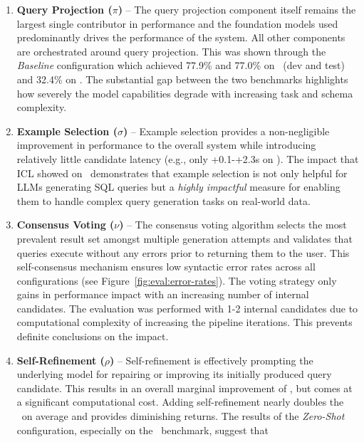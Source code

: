 \begin{enumerate}
    \item \textbf{Query Projection ($\pi$)} – The query projection component
        itself remains the largest single contributor in performance and the
        foundation models used predominantly drives the performance of the
        system. All other components are orchestrated around query projection.
        This was shown through the \textit{Baseline} configuration which
        achieved 77.9\% and 77.0\% on \Spider~(dev and test) and 32.4\% on
        \Bird. The substantial gap between the two benchmarks highlights how
        severely the model capabilities degrade with increasing task and schema
        complexity.
    \item \textbf{Example Selection ($\sigma$)} – Example selection provides a
        non-negligible improvement in performance to the overall system while
        introducing relatively little candidate latency (e.g., only +0.1-+2.3s
        on \Spider). The impact that ICL showed on \Bird~demonstrates that
        example selection is not only helpful for LLMs generating SQL queries
        but a \textit{highly impactful} measure for enabling them to handle
        complex query generation tasks on real-world data.
    \item \textbf{Consensus Voting ($\nu$)} – The consensus voting algorithm
        selects the most prevalent result set amongst multiple generation
        attempts and validates that queries execute without any errors prior to
        returning them to the user. This self-consensus mechanism ensures low
        syntactic error rates across all configurations
        (see Figure~\ref{fig:eval:error-rates}). The voting strategy only
        gains in performance impact with an increasing number of
        internal candidates. The evaluation was performed with 1-2 internal
        candidates due to computational complexity of increasing the pipeline
        iterations. This prevents definite conclusions on the impact.
    \item \textbf{Self-Refinement ($\rho$)} – Self-refinement is effectively
        prompting the underlying model for repairing or improving its initially
        produced query candidate. This results in an overall marginal
        improvement of \EA, but comes at a significant computational cost.
        Adding self-refinement nearly doubles the \CL~on average and provides
        diminishing returns. The results of the \textit{Zero-Shot}
        configuration, especially on the \Bird~benchmark, suggest that

\end{enumerate}
